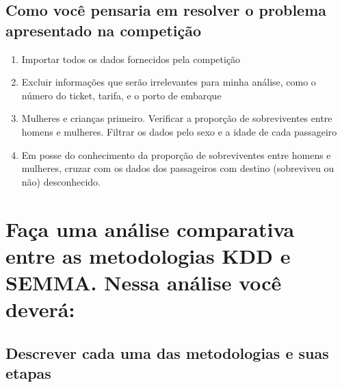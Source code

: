 \documentclass{article}
\begin{document}
\subsection{Como você pensaria em resolver o problema apresentado na competição}
\begin{enumerate}
    \item Importar todos os dados fornecidos pela competição
    \item Excluir informações que serão irrelevantes para minha análise, como o número do ticket, tarifa, e o porto de embarque
    \item Mulheres e crianças primeiro. Verificar a proporção de sobreviventes entre homens e mulheres. Filtrar os dados pelo sexo e a idade de cada passageiro
    \item Em posse do conhecimento da proporção de sobreviventes entre homens e mulheres, cruzar com os dados dos passageiros com destino (sobreviveu ou não) desconhecido.
\end{enumerate}


\section{Faça uma análise comparativa entre as metodologias KDD e SEMMA. Nessa análise você deverá:}
\subsection{Descrever cada uma das metodologias e suas etapas}
\end{document}
